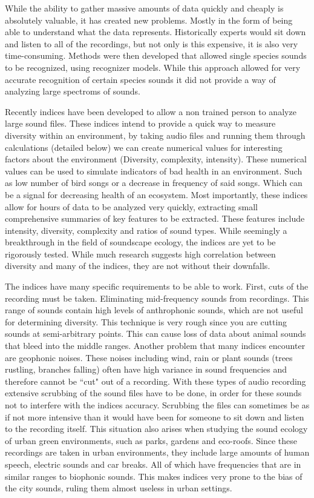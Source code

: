 While the ability to gather massive amounts of data quickly and cheaply is absolutely valuable, it has created new problems. Mostly in the form of being able to understand what the data represents. Historically experts would sit down and listen to all of the recordings, but not only is this expensive, it is also very time-consuming. Methods were then developed that allowed single species sounds to be recognized, using recognizer models. While this approach allowed for very accurate recognition of certain species sounds it did not provide a way of analyzing large spectroms of sounds.\par
Recently indices have been developed to allow a non trained person to analyze large sound files. These indices intend to provide a quick way to measure diversity within an environment, by taking audio files and running them through calculations (detailed below) we can create numerical values for interesting factors about the environment (Diversity, complexity, intensity). These numerical values can be used to simulate indicators of bad health in an environment. Such as low number of bird songs or a decrease in frequency of said songs. Which can be a signal for decreasing health of an ecosystem. Most importantly, these indices allow for hours of data to be analyzed very quickly, extracting small comprehensive summaries of key features to be extracted. These features include intensity, diversity, complexity and ratios of sound types. While seemingly a breakthrough in the field of soundscape ecology, the indices are yet to be rigorously tested. While much research suggests high correlation between diversity and many of the indices, they are not without their downfalls.\par
The indices have many specific requirements to be able to work. First, cuts of the recording must be taken. Eliminating mid-frequency sounds from recordings. This range of sounds contain high levels of anthrophonic sounds, which are not useful for determining diversity.\cite{scienceOfSound} This technique is very rough since you are cutting sounds at semi-arbitrary points. This can cause loss of data about animal sounds that bleed into the middle ranges. Another problem that many indices encounter are geophonic noises. These noises including wind, rain or plant sounds (trees rustling, branches falling) often have high variance in sound frequencies and therefore cannot be ``cut" out of a recording. With these types of audio recording extensive scrubbing of the sound files have to be done, in order for these sounds not to interfere with the indices accuracy. Scrubbing the files can sometimes be as if not more intensive than it would have been for someone to sit down and listen to the recording itself. This situation also arises when studying the sound ecology of urban green environments, such as parks, gardens and eco-roofs. Since these recordings are taken in urban environments, they include large amounts of human speech, electric sounds and car breaks. All of which have frequencies that are in similar ranges to biophonic sounds. This makes indices very prone to the bias of the city sounds, ruling them almost useless in urban settings.\par

